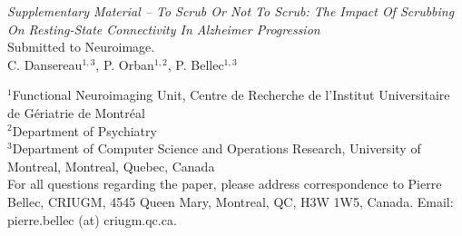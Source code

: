 \documentclass[authoryear]{elsarticle}
\begin{document}

\clearpage
\pagebreak
\renewcommand{\thefigure}{S\arabic{figure}}
\renewcommand{\thetable}{S\arabic{table}}
\setcounter{figure}{0}
\begin{center}
\emph{Supplementary Material {--} To Scrub Or Not To Scrub: The Impact Of Scrubbing On Resting-­State Connectivity In Alzheimer Progression}\\

\vspace{\baselineskip}Submitted to Neuroimage.\\

\vspace{\baselineskip}C. Dansereau$^{1,3}$,  P. Orban$^{1,2}$, P. Bellec$^{1,3}$\\
\end{center}
$^1$Functional Neuroimaging Unit, Centre de Recherche de l'Institut Universitaire de G\'eriatrie de Montr\'eal\\
$^2$Department of Psychiatry\\
$^3$Department of Computer Science and Operations Research, University of Montreal, Montreal, Quebec, Canada\\

For all questions regarding the paper, please address correspondence to Pierre Bellec, CRIUGM, 4545 Queen Mary, Montreal, QC, H3W 1W5, Canada. Email: pierre.bellec (at) criugm.qc.ca.\\
\end{document}
